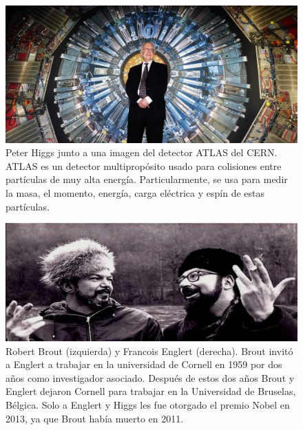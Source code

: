 \documentclass[12pt,a4paper]{report}
\begin{document}
\begin{figure}
\includegraphics[scale=0.5]{images/higgslhc2.jpg}
\caption{Peter Higgs junto a una imagen del detector ATLAS del CERN. ATLAS es un detector multiprop\'osito usado para colisiones entre part\'iculas de muy alta energ\'ia. Particularmente, se usa para medir la masa, el momento, energ\'ia, carga el\'ectrica y esp\'in de estas part\'iculas.}
\end{figure}


\begin{figure}
	\includegraphics[scale=0.3]{images/brout_englert.png}
	\caption{Robert Brout (izquierda) y Francois Englert (derecha). Brout invit\'o a Englert a trabajar en la universidad de Cornell en 1959 por dos años como investigador asociado. Despu\'es de estos dos años Brout y Englert dejaron Cornell para trabajar en la Universidad de Bruselas, B\'elgica. Solo a Englert y Higgs les fue otorgado el premio Nobel en 2013, ya que Brout hab\'ia muerto en 2011.}
\end{figure}
\end{document}
